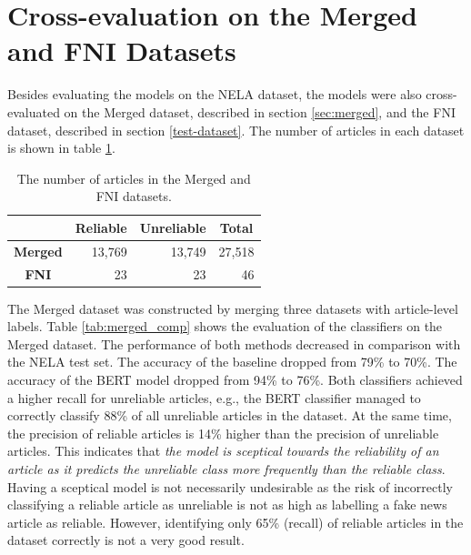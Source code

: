 \section{Cross-evaluation on the Merged and FNI Datasets}
Besides evaluating the models on the NELA dataset, the models were also cross-evaluated on the Merged dataset, described in section \ref{sec:merged}, and the FNI dataset, described in section \ref{test-dataset}. The number of articles in each dataset is shown in table \ref{tab:merged_fni_size}.

\begin{table}[H]
    \centering
\begin{tabular}{c|r|r|r|}
\cline{2-4}
                                      & \multicolumn{1}{c|}{\textbf{Reliable}} & \multicolumn{1}{c|}{\textbf{Unreliable}} & \multicolumn{1}{c|}{\textbf{Total}} \\ \hline
\multicolumn{1}{|c|}{\textbf{Merged}} & 13,769                                 & 13,749                                   & 27,518                              \\ \hline
\multicolumn{1}{|c|}{\textbf{FNI}}    & 23                                     & 23                                       & 46                                  \\ \hline
\end{tabular}
    \caption{The number of articles in the Merged and FNI datasets.}
    \label{tab:merged_fni_size}
\end{table}

The Merged dataset was constructed by merging three datasets with article-level labels. Table \ref{tab:merged_comp} shows the evaluation of the classifiers on the Merged dataset. The performance of both methods decreased in comparison with the NELA test set. The accuracy of the baseline dropped from 79\% to 70\%. The accuracy of the BERT model dropped from 94\% to 76\%. Both classifiers achieved a higher recall for unreliable articles, e.g., the BERT classifier managed to correctly classify 88\% of all unreliable articles in the dataset. At the same time, the precision of reliable articles is 14\% higher than the precision of unreliable articles. This indicates that \emph{the model is sceptical towards the reliability of an article as it predicts the unreliable class more frequently than the reliable class}. Having a sceptical model is not necessarily undesirable as the risk of incorrectly classifying a reliable article as unreliable is not as high as labelling a fake news article as reliable. However, identifying only 65\% (recall) of reliable articles in the dataset correctly is not a very good result.

